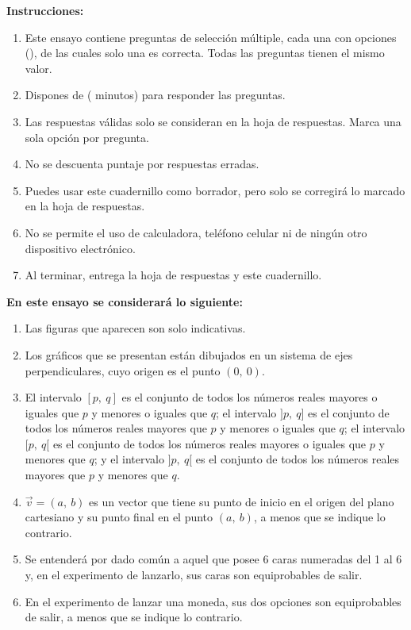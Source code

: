 \textbf{\Large{Instrucciones:}}
\begin{enumerate}
    \item Este ensayo contiene \NumPreguntas{} preguntas de selección múltiple, cada una con \NumAlternativas{} opciones (\LetrasAlternativas), de las cuales solo una es correcta. Todas las preguntas tienen el mismo valor.
    \item Dispones de \Duracion{} (\Minutos{} minutos) para responder las \NumPreguntas{} preguntas.
    \item Las respuestas válidas solo se consideran en la hoja de respuestas. Marca una sola opción por pregunta.
    \item No se descuenta puntaje por respuestas erradas.
    \item Puedes usar este cuadernillo como borrador, pero solo se corregirá lo marcado en la hoja de respuestas.
    \item No se permite el uso de calculadora, teléfono celular ni de ningún otro dispositivo electrónico.
    \item Al terminar, entrega la hoja de respuestas y este cuadernillo.
\end{enumerate}

\ifconsideracionesmatematicas
\vspace{0.3cm}
\textbf{\large{En este ensayo se considerará lo siguiente:}}
\begin{enumerate}
    \item Las figuras que aparecen son solo indicativas.
    \item Los gráficos que se presentan están dibujados en un sistema de ejes perpendiculares, cuyo origen es el punto $(0,\ 0)$.
    \item El intervalo $[p,\ q]$ es el conjunto de todos los números reales mayores o iguales que $p$ y menores o iguales que $q$; el intervalo $]p,\ q]$ es el conjunto de todos los números reales mayores que $p$ y menores o iguales que $q$; el intervalo $[p,\ q[$ es el conjunto de todos los números reales mayores o iguales que $p$ y menores que $q$; y el intervalo $]p,\ q[$ es el conjunto de todos los números reales mayores que $p$ y menores que $q$.
    \item $\vec{v}=(a,\ b)$ es un vector que tiene su punto de inicio en el origen del plano cartesiano y su punto final en el punto $(a,\ b)$, a menos que se indique lo contrario.
    \item Se entenderá por dado común a aquel que posee 6 caras numeradas del 1 al 6 y, en el experimento de lanzarlo, sus caras son equiprobables de salir.
    \item En el experimento de lanzar una moneda, sus dos opciones son equiprobables de salir, a menos que se indique lo contrario.
\end{enumerate}

